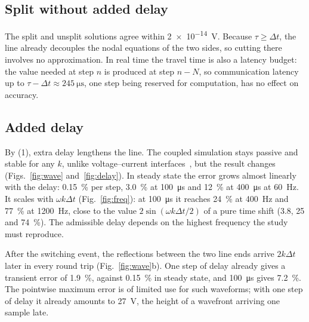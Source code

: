 \documentclass[conference]{IEEEtran}
\begin{document}
\subsection{Split without added delay}
The split and unsplit solutions agree within \SI{2e-14}{V}. Because $\tau\ge\Delta t$, the line already decouples the nodal equations of the two sides, so cutting there involves no approximation. In real time the travel time is also a latency budget: the value needed at step $n$ is produced at step $n-N$, so communication latency up to $\tau-\Delta t\approx\SI{245}{\micro\second}$, one step being reserved for computation, has no effect on accuracy.

\subsection{Added delay}
By (1), extra delay lengthens the line. The coupled simulation stays passive and stable for any $k$, unlike voltage--current interfaces~\cite{ren2008}, but the result changes (Figs.~\ref{fig:wave} and~\ref{fig:delay}). In steady state the error grows almost linearly with the delay: \SI{0.15}{\percent} per step, \SI{3.0}{\percent} at \SI{100}{\micro\second} and \SI{12}{\percent} at \SI{400}{\micro\second} at \SI{60}{Hz}. It scales with $\omega k\Delta t$ (Fig.~\ref{fig:freq}): at \SI{100}{\micro\second} it reaches \SI{24}{\percent} at \SI{400}{Hz} and \SI{77}{\percent} at \SI{1200}{Hz}, close to the value $2\sin(\omega k\Delta t/2)$ of a pure time shift (3.8, 25 and \SI{74}{\percent}). The admissible delay depends on the highest frequency the study must reproduce.

After the switching event, the reflections between the two line ends arrive $2k\Delta t$ later in every round trip (Fig.~\ref{fig:wave}b). One step of delay already gives a transient error of \SI{1.9}{\percent}, against \SI{0.15}{\percent} in steady state, and \SI{100}{\micro\second} gives \SI{7.2}{\percent}. The pointwise maximum error is of limited use for such waveforms; with one step of delay it already amounts to \SI{27}{V}, the height of a wavefront arriving one sample late.
\end{document}
